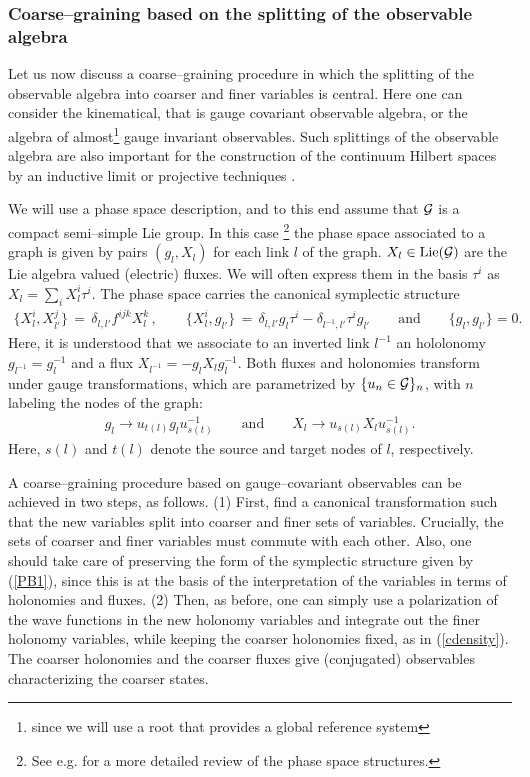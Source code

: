 \documentclass[nofootinbib,superscriptaddress,eqsecnum,tightenlines,11pt]{revtex4-1}
\def\q{\qquad}
\def\ba{\begin{eqnarray}}
\def\ea{\end{eqnarray}}
\begin{document}
\subsubsection{Coarse--graining based on the splitting of the  observable algebra}


Let us now discuss a coarse--graining procedure in which the splitting of the observable algebra into coarser and finer variables is central.  Here one can consider the kinematical, that is gauge covariant  observable algebra, or the algebra of almost\footnote{since we will use a root that provides a global reference system} gauge invariant observables. Such splittings of the observable algebra are also important for the construction of the continuum Hilbert spaces by an inductive limit \cite{DG14b} or projective techniques \cite{Lanery}. 

We will use a phase space description, and to this end assume that ${\cal G}$ is a compact semi--simple Lie group. 
In this case%
\footnote{See e.g. \cite{DG14b} for a more detailed review of the phase space structures.}
the phase space associated to a graph is given by pairs $(g_l,X_l)$ for each link $l$ of the graph. $X_l\in\text{Lie} ({\cal G})$ are the Lie algebra valued (electric) fluxes. 
We will often express them in the basis $\tau^i$ as $X_l=\sum_i X^i_l \tau^i$. 
The phase space carries the {canonical} symplectic structure
\ba\label{PB1}
\{X^i_l, X^j_{l'}\}\,=\,\delta_{l,l'}f^{ijk}X^k_l \, , \q \{X^i_l,g_{l'}\} \,=\, \delta_{l,l'} g_l \tau^i - \delta_{l^{-1},l'} \tau^i g_{l'} \q\text{and}\q \{g_l,g_{l'}\}=0 .
\ea
Here, it is understood that we associate to an inverted link $l^{-1}$ an hololonomy $g_{l^{-1}}=g^{-1}_l$ and a flux $X_{l^{-1}}=-g_l X_l g_l^{-1}$.
Both fluxes and holonomies transform under gauge transformations, which are parametrized by $\{u_n\in{\cal G}\}_n$, with $n$ labeling the nodes of the graph: 
\ba
g_l \rightarrow  u_{t(l)} g_l u^{-1}_{s(t)} \q \text{and}\q  X_l \rightarrow u_{s(l)} X_l u^{-1}_{s(l)} .
\ea
Here, $s(l)$ and $t(l)$ denote the source and target nodes of $l$, respectively. 

A coarse--graining procedure based on gauge--covariant observables can be achieved in two steps, as follows. 
(1) First, find a canonical transformation such that the new variables split into coarser and finer sets of variables. 
Crucially, the sets of coarser and finer variables must commute with each other.
Also, one should take care of preserving the form of the symplectic structure given by (\ref{PB1}), since this is at the basis of the interpretation of the variables in terms of holonomies and fluxes.
(2) Then, as before, one can simply use a polarization of the wave functions in the new holonomy variables and integrate out the finer holonomy variables, while keeping the coarser holonomies fixed, as in (\ref{cdensity}). 
The coarser holonomies and the coarser fluxes give (conjugated) observables characterizing the coarser states. 
\end{document}
